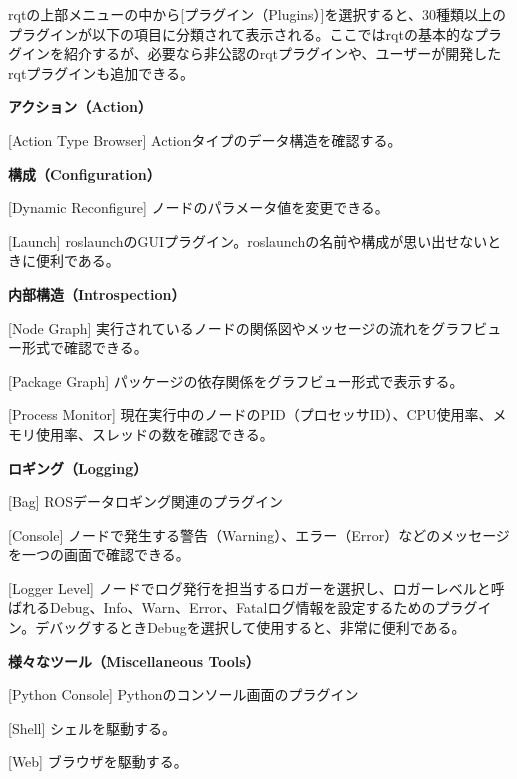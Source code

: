 rqtの上部メニューの中から[プラグイン（Plugins）]を選択すると、30種類以上のプラグインが以下の項目に分類されて表示される。ここではrqtの基本的なプラグインを紹介するが、必要なら非公認のrqtプラグインや、ユーザーが開発したrqtプラグインも追加できる。

\textbf{アクション（Action）}
\begin{description}
\item  {[Action Type Browser]} Actionタイプのデータ構造を確認する。\\
\end{description}

\textbf{構成（Configuration）}
\begin{description}
\item  {[Dynamic Reconfigure]} ノードのパラメータ値を変更できる。
\item  {[Launch]} roslaunchのGUIプラグイン。roslaunchの名前や構成が思い出せないときに便利である。\\
\end{description}

\textbf{内部構造（Introspection）}
\begin{description}
\item  {[Node Graph]} 実行されているノードの関係図やメッセージの流れをグラフビュー形式で確認できる。
\item  {[Package Graph]} パッケージの依存関係をグラフビュー形式で表示する。
\item  {[Process Monitor]} 現在実行中のノードのPID（プロセッサID）、CPU使用率、メモリ使用率、スレッドの数を確認できる。\\
\end{description}

\textbf{ロギング（Logging）}
\begin{description}
\item  {[Bag]} ROSデータロギング関連のプラグイン
\item  {[Console]} ノードで発生する警告（Warning）、エラー（Error）などのメッセージを一つの画面で確認できる。
\item  {[Logger Level]} ノードでログ発行を担当するロガーを選択し、ロガーレベルと呼ばれるDebug、Info、Warn、Error、Fatalログ情報を設定するためのプラグイン。デバッグするときDebugを選択して使用すると、非常に便利である。\\
\end{description}

\textbf{様々なツール（Miscellaneous Tools）}
\begin{description}
\item  {[Python Console]} Pythonのコンソール画面のプラグイン
\item  {[Shell]} シェルを駆動する。
\item  {[Web]} ブラウザを駆動する。\\
\end{description}

